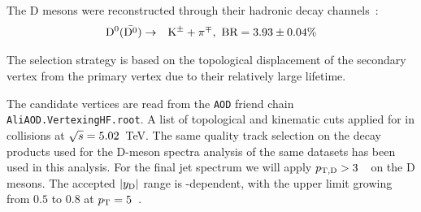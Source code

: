 The D mesons were reconstructed through their hadronic decay channels~\cite{PDG:2018}:
\begin{eqnarray*}
\mathrm{D^{0}} (\bar{\mathrm{D^{0}}}) &\to& {\rm K}^{\pm} + \pi^{\mp}  , {\text{ BR}} = 3.93\pm {0.04} \%\\
\end{eqnarray*}

The selection strategy is based on the topological displacement of the secondary vertex from the primary vertex due to their relatively large lifetime.

The candidate vertices are read from the \texttt{AOD} friend chain \texttt{AliAOD.VertexingHF.root}. A list of topological and kinematic cuts applied for \Dzero in \pp collisions at $\sqrt{s}=5.02$~TeV.
The same quality track selection on the decay products used for the D-meson spectra analysis of the same datasets has been used in this analysis.
For the final jet spectrum we will apply $p_{\mathrm{T,D}}> 3$~\GeVc\ on the D mesons. The accepted $|y_{\rm D}|$ range is \pt-dependent, with the upper limit growing from $0.5$ to $0.8$ at $p_{\rm T}=5$~\GeVc.

    
    

